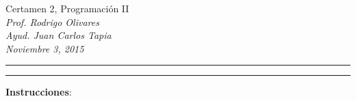 \documentclass[10pt]{article}
\begin{document}
    \begin{center}
		{\Large Certamen 2, Programaci\'on II} \\
		\emph{\small Prof. Rodrigo Olivares} \\
		\emph{\small Ayud. Juan Carlos Tapia} \\
		\emph{\scriptsize Noviembre 3, 2015} 
	\end{center}

	\vspace*{-35pt}
	\begin{center}
		\rule{1\textwidth}{.3pt}
	\end{center}
	\vspace*{-42pt}
	\begin{center}
		\rule{1\textwidth}{2pt}
	\end{center}

	\vspace*{-15pt}

	{\small \textbf{Instrucciones}:}

	\vspace*{-15pt}
\end{document}

